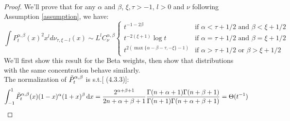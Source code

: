 \documentclass{article}
\begin{document}
\begin{proof}
We'll prove that for any $\alpha$ and $\beta$, $\xi,\tau>-1$, $l>0$ and $\nu$ following Assumption \ref{assumption}, we have:
\begin{equation*}
    \int P_t^{\alpha,\beta}(x)^2x^l d\nu_{\tau,\xi-l}(x) \sim  L^lC^{\alpha,\beta}_\nu\left\{
	\begin{array}{ll}
		  t^{-1-2\beta}& \mbox{if } 
		  \alpha<\tau+1/2 \text{ and } \beta <\xi+1/2\\
		  t^{-2(\xi+1)}\log t& \mbox{if } 
		  \alpha=\tau+1/2 \text{ and } \beta =\xi+1/2\\
		  t^{2(\max\{\alpha-\beta-\tau,-\xi\}-1)}& \mbox{if } 
		  \alpha>\tau+1/2 \text{ or } \beta >\xi+1/2
	\end{array}
\right.
\end{equation*}
We'll first show this result for the Beta weights, then show that distributions with the same concentration behave similarly. \\
The normalization of $\Tilde{P}^{\alpha,\beta}_t$ is s.t.[ \cite{szego1975orthogonal} (4.3.3)]:
\begin{equation}
    \int_{-1}^1\Tilde{P}_t^{\alpha,\beta}(x)(1-x)^\alpha(1+x)^\beta \mathop{}\!\mathrm{d} x=\frac{2^{\alpha+\beta+1}}{2n+\alpha+\beta+1}\frac{\Gamma(n+\alpha+1)\Gamma(n+\beta+1)}{\Gamma(n+1)\Gamma(n+\alpha+\beta+1)}=\Theta(t^{-1})
\end{equation}


\end{proof}
\end{document}
